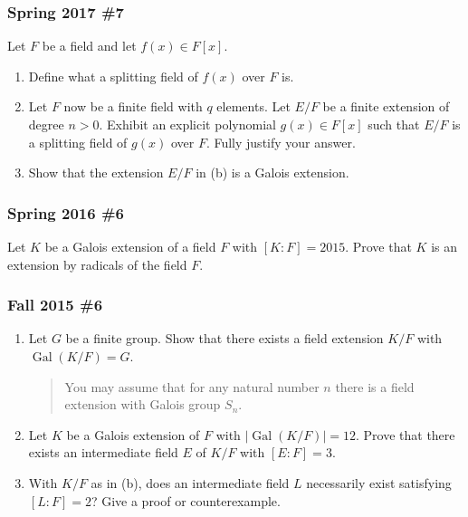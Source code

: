 \hypertarget{spring-2017-7}{%
\subsubsection{Spring 2017 \#7}\label{spring-2017-7}}

Let \(F\) be a field and let \(f(x) \in F[x]\).

\begin{enumerate}
\def\labelenumi{\alph{enumi}.}
\item
  Define what a splitting field of \(f(x)\) over \(F\) is.
\item
  Let \(F\) now be a finite field with \(q\) elements. Let \(E/F\) be a
  finite extension of degree \(n>0\). Exhibit an explicit polynomial
  \(g(x) \in F[x]\) such that \(E/F\) is a splitting field of \(g(x)\)
  over \(F\). Fully justify your answer.
\item
  Show that the extension \(E/F\) in (b) is a Galois extension.
\end{enumerate}

\hypertarget{spring-2016-6}{%
\subsubsection{Spring 2016 \#6}\label{spring-2016-6}}

Let \(K\) be a Galois extension of a field \(F\) with \([K: F] = 2015\).
Prove that \(K\) is an extension by radicals of the field \(F\).

\hypertarget{fall-2015-6}{%
\subsubsection{Fall 2015 \#6}\label{fall-2015-6}}

\begin{enumerate}
\def\labelenumi{\alph{enumi}.}
\item
  Let \(G\) be a finite group. Show that there exists a field extension
  \(K/F\) with \({ \operatorname{Gal}} (K/F) = G\).

  \begin{quote}
  You may assume that for any natural number \(n\) there is a field
  extension with Galois group \(S_n\).
  \end{quote}
\item
  Let \(K\) be a Galois extension of \(F\) with
  \({\left\lvert {{ \operatorname{Gal}} (K/F)} \right\rvert} = 12\).
  Prove that there exists an intermediate field \(E\) of \(K/F\) with
  \([E: F] = 3\).
\item
  With \(K/F\) as in (b), does an intermediate field \(L\) necessarily
  exist satisfying \([L: F] = 2\)? Give a proof or counterexample.
\end{enumerate}

